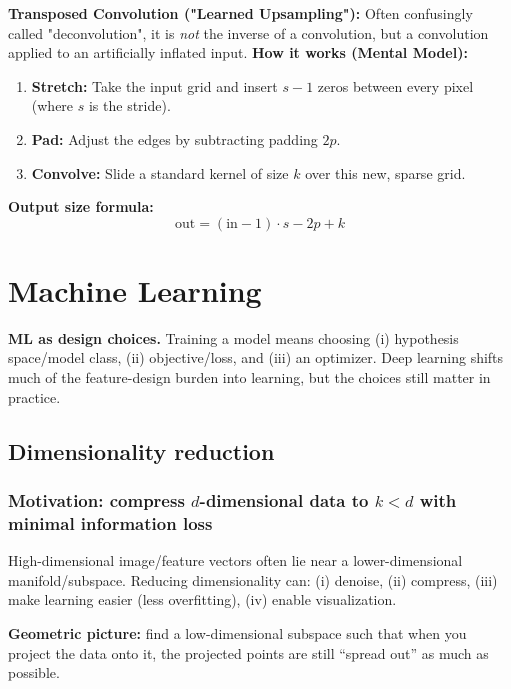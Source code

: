 \documentclass[11pt,a4paper]{article}
\begin{document}
\begin{mathrule}
\textbf{Transposed Convolution ("Learned Upsampling"):}
Often confusingly called "deconvolution", it is \emph{not} the inverse of a convolution, but a convolution applied to an artificially inflated input.
\textbf{How it works (Mental Model):}
\begin{enumerate}
  \item \textbf{Stretch:} Take the input grid and insert $s-1$ zeros between every pixel (where $s$ is the stride).
  \item \textbf{Pad:} Adjust the edges by subtracting padding $2p$.
  \item \textbf{Convolve:} Slide a standard kernel of size $k$ over this new, sparse grid.
\end{enumerate}
\textbf{Output size formula:}
\[
\text{out} = (\text{in}-1)\cdot s - 2p + k
\]
\end{mathrule}

\section{Machine Learning}

\begin{notebox}
\textbf{ML as design choices.}
Training a model means choosing (i) hypothesis space/model class, (ii) objective/loss,
and (iii) an optimizer. Deep learning shifts much of the feature-design burden into learning,
but the choices still matter in practice.
\end{notebox}

\subsection{Dimensionality reduction}
\subsubsection{Motivation: compress $d$-dimensional data to $k<d$ with minimal information loss}
High-dimensional image/feature vectors often lie near a lower-dimensional manifold/subspace.
Reducing dimensionality can:
(i) denoise, (ii) compress, (iii) make learning easier (less overfitting), (iv) enable visualization.

\begin{intbox}
\textbf{Geometric picture:} find a low-dimensional subspace such that when you project the data onto it,
the projected points are still ``spread out'' as much as possible.
\end{intbox}
\end{document}
